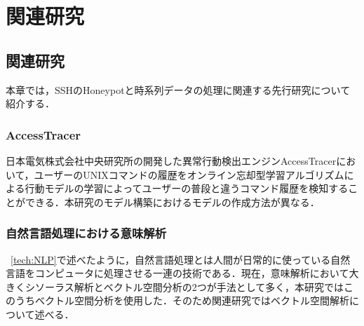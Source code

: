 \chapter{関連研究}
 \label{rela}

\section{関連研究}
本章では，SSHのHoneypotと時系列データの処理に関連する先行研究について紹介する．

\subsection{AccessTracer}
日本電気株式会社中央研究所の開発した異常行動検出エンジンAccessTracer\cite{AccessTracer}において，ユーザーのUNIXコマンドの履歴をオンライン忘却型学習アルゴリズムによる行動モデルの学習によってユーザーの普段と違うコマンド履歴を検知することができる．本研究のモデル構築におけるモデルの作成方法が異なる．

\subsection{自然言語処理における意味解析}
~\ref{tech:NLP}で述べたように，自然言語処理とは人間が日常的に使っている自然言語をコンピュータに処理させる一連の技術である．現在，意味解析において大きくシソーラス解析とベクトル空間分析の2つが手法として多く，本研究ではこのうちベクトル空間分析を使用した．そのため関連研究ではベクトル空間解析について述べる．
